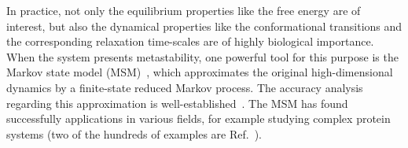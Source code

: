 \documentclass[epjST]{svjour}
\begin{document}
In practice, not only the equilibrium properties like the free energy are of interest,
but also the dynamical properties like the conformational transitions and the corresponding relaxation time-scales
are of highly biological importance.
When the system presents metastability,
one powerful tool for this purpose
is the Markov state model (MSM)~\cite{prinz2011probing,prinz2011markov,schuette2011markov}, which
approximates the original high-dimensional dynamics by a finite-state reduced
Markov process.
The accuracy analysis regarding  this approximation is well-established~\cite{sarich2010approximation,djurdjevac2012estimating}.
The MSM has found successfully applications in various fields, for example studying complex protein systems
(two of the hundreds of examples are Ref.~\cite{noe2009constructing,kohlhoff2014cloud}).
\end{document}
